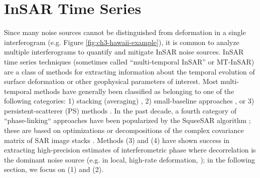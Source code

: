 

\section{InSAR Time Series}
\label{sec:ch3-insar-ts}

Since many noise sources cannot be distinguished from deformation in a single interferogram (e.g. Figure \ref{fig:ch3-hawaii-example}), it is common to analyze multiple interferograms to quantify and mitigate InSAR noise sources.
InSAR time series techniques (sometimes called ``multi-temporal InSAR'' or MT-InSAR) are a class of methods for extracting information about the temporal evolution of surface deformation or other geophysical parameters of interest.  Most multi-temporal methods have generally been classified as belonging to one of the following categories: 1) stacking (averaging) \citep{Zebker1997AtmosphericEffectsInterferometric, Sandwell1998PhaseGradientApproach}, 2) small-baseline approaches \citep{Berardino2002NewAlgorithmSurface}, or 3) persistent-scatterer (PS) methods \citep{Ferretti2001PermanentScatterersSar, Hooper2006PersistentScatterRadar}. In the past decade, a fourth category of ``phase-linking`` approaches have been popularized by the SqueeSAR algorithm \citep{Ferretti2011NewAlgorithmProcessing}; these are based on optimizations or decompositions of the complex covariance matrix of SAR image stacks \citep{Guarnieri2008ExploitationTargetStatistics, Fornaro2015CaesarApproachBased, Ansari2018EfficientHighPrecision}. Methods (3) and (4) have shown success in extracting high-precision estimates of interferometric phase where decorrelation is the dominant noise source (e.g. in local, high-rate deformation, \citep{Tebaldini2010MethodsPerformancesMulti}); in the following section, we focus on (1) and (2).


